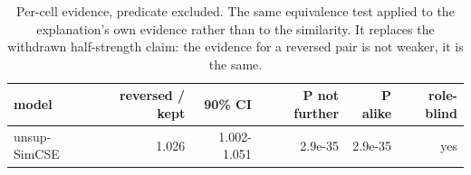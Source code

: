 \begin{table}[t]
\centering
\small
\caption{Per-cell evidence, predicate excluded. The same equivalence test applied to the explanation's own evidence rather than to the similarity. It replaces the withdrawn half-strength claim: the evidence for a reversed pair is not weaker, it is the same.}
\begin{tabular}{lrrrrr}
\toprule
model & reversed / kept & 90\% CI & P not further & P alike & role-blind \\
\midrule
unsup-SimCSE & 1.026 & 1.002-1.051 & 2.9e-35 & 2.9e-35 & yes \\
\bottomrule
\end{tabular}
\end{table}
